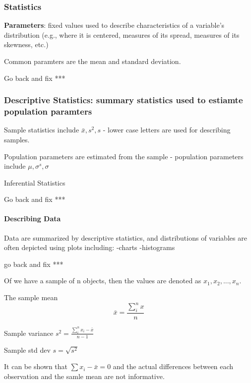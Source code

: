 \documentclass[12pt,]{article}
\let\oldparagraph\paragraph
\renewcommand{\paragraph}[1]{\oldparagraph{#1}\mbox{}}
\begin{document}
\hypertarget{statistics}{%
\subsubsection{Statistics}\label{statistics}}

\textbf{Parameters}: fixed values used to describe characteristics of a
variable's distribution (e.g., where it is centered, measures of its
spread, measures of its skewness, etc.)

Common paramters are the mean and standard deviation.

Go back and fix ***

\hypertarget{descriptive-statistics-summary-statistics-used-to-estiamte-population-paramters}{%
\subsubsection{\texorpdfstring{\textbf{Descriptive Statistics:} summary
statistics used to estiamte population
paramters}{Descriptive Statistics: summary statistics used to estiamte population paramters}}\label{descriptive-statistics-summary-statistics-used-to-estiamte-population-paramters}}

Sample statistics include \(\bar{x}, s^2, s\) - lower case letters are
used for describing samples.

Population parameters are estimated from the sample - population
parameters include \(\mu, \sigma^s, \sigma\)

Inferential Statistics

Go back and fix ***

\hypertarget{describing-data}{%
\paragraph{Describing Data}\label{describing-data}}

Data are summarized by descriptive statistics, and distributions of
variables are often depicted using plots including: -charts -histograms

go back and fix ***

Of we have a sample of n objects, then the values are denoted as
\(x_1, x_2, ..., x_n\).

The sample mean \[\bar{x} = \frac{\sum_i^nx}{n}\]

Sample variance \(s^2 = \frac{\sum_i^n{x_i-\bar{x}}}{n-1}\)

Sample std dev \(s = \sqrt{s^2}\)

It can be shown that \(\sum{x_i-\bar{x}}=0\) and the actual differences
between each observation and the samle mean are not informative.
\end{document}
